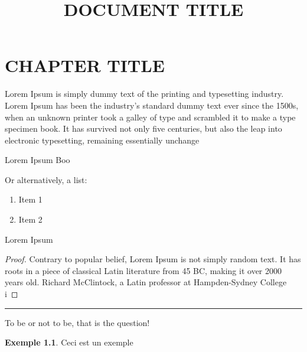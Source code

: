 \documentclass[12pt]{report}
\title{DOCUMENT TITLE}
\theoremstyle{definition}
\newtheorem*{example}{Exemple}
\newenvironment{preuve}{\renewcommand{\proofname}{Preuve}\begin{proof}}{\end{proof}\noindent\textcolor[RGB]{220,220,220}{\rule{\textwidth}{1pt}}}
\renewcommand*{\proofname}{Preuve}
\begin{document}
\chapter{CHAPTER TITLE}
    Lorem Ipsum is simply dummy text of the printing and typesetting industry. 
    Lorem Ipsum has been the industry's standard dummy text ever since the 1500s, 
    when an unknown printer took a galley of type and scrambled it to make a type specimen book. It has survived not only five centuries, but also the leap into electronic typesetting, remaining essentially unchange
    
    \begin{defi}
        \label{def:DEFINITION}
        Lorem Ipsum Boo
    \end{defi}

    Or alternatively, a list:
    \begin{enumerate}
        \setlength{\itemsep}{0pt}
        \item Item 1
        \item Item 2
    \end{enumerate}
    \pagebreak
    \begin{prop}
        \label{thm:THEOREM}
        Lorem Ipsum
    \end{prop}
    \begin{preuve}
        Contrary to popular belief, Lorem Ipsum is not simply random text. 
        It has roots in a piece of classical Latin literature from 45 BC, 
        making it over 2000 years old. Richard McClintock, a Latin professor at Hampden-Sydney College i
    \end{preuve}

    \begin{attention}
        To be or not to be, that is the question!
    \end{attention}


    \begin{example}
        Ceci est un exemple
    \end{example}
\end{document}
